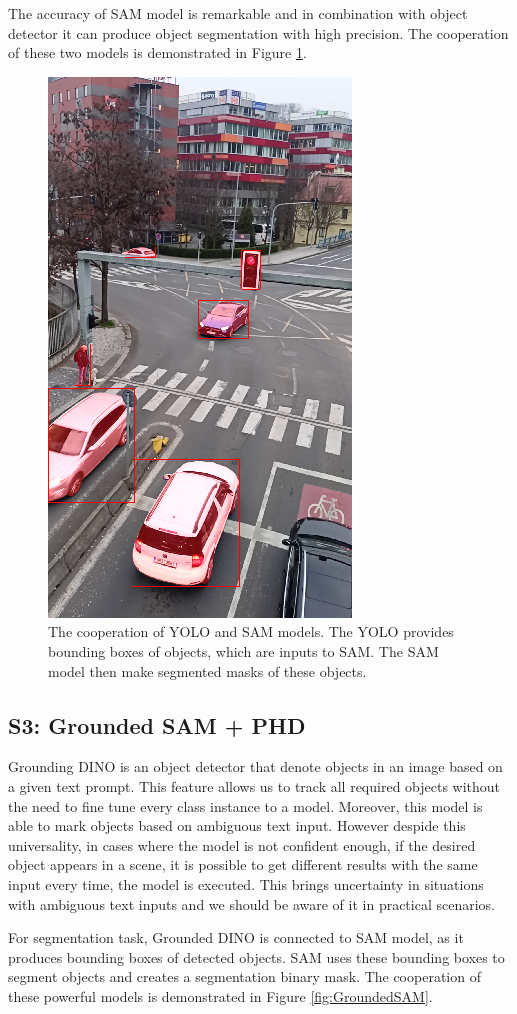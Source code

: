 The accuracy of SAM model is remarkable and in combination with object detector it can produce object segmentation
with high precision. The cooperation of these two models is demonstrated in Figure \ref{fig:yolo_sam_seg}.
\begin{figure}[h!t]
  \centering
  \includegraphics[width=0.35\linewidth]{text/chapter_04/imgs/YOLO_SAM_02}
  \caption{The cooperation of YOLO and SAM models. The YOLO provides bounding boxes of objects, which are inputs to
  SAM. The SAM model then make segmented masks of these objects.}
  \label{fig:yolo_sam_seg}
\end{figure}

\subsection{S3: Grounded SAM + PHD}
Grounding DINO is an object detector that denote objects in an image based on a given text prompt. This feature
allows us to track all required objects without the need to fine tune every class instance to a model. Moreover, this
model is able to mark objects based on ambiguous text input. However despide this universality, in cases where the
model is not confident enough, if the desired object appears in a scene, it is possible to get different results with
the same input every time, the model is executed. This brings uncertainty in situations with ambiguous text inputs
and we should be aware of it in practical scenarios.

For segmentation task, Grounded DINO is connected to SAM model, as it produces bounding boxes of detected objects.
SAM uses these bounding boxes to segment objects and creates a segmentation binary mask. The cooperation of these
powerful models is demonstrated in Figure \ref{fig:GroundedSAM}.

